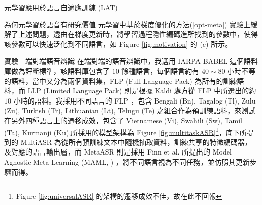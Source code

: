 \documentclass[12pt,UTF8,fntef]{article}
\begin{document}
\begin{section}{元學習應用於語言自適應訓練 (LAT)}
\begin{subsection}{為何元學習於語音有研究價值}
      元學習中基於梯度優化的方法(\ref{opt-meta}) 實驗上緩解了上述問題，透由在梯度更新時，將學習過程隱性編碼進所找到的參數中，使得該參數可以快速泛化到不同語言，如 Figure \ref{fig:motivation} 的 (c) 所示。
    \end{subsection}
    \begin{subsection}{實驗 - 端對端語音辨識} \label{progress}
      在端對端的語音辨識中，我選用 IARPA-BABEL 這個語料庫做為評斷標準，該語料庫包含了 $10$ 餘種語言，每個語言約有 $40 \sim 80$ 小時不等的語料，當中又分為兩個資料集，FLP (Full Language Pack) 為所有的訓練語料，而 LLP (Limited Language Pack) 則是根據 Kaldi 處方從 FLP 中所選出的約 $10$ 小時的語料。我採用不同語言的 FLP ，包含 Bengali (Bn), Tagalog (Tl), Zulu (Zu), Turkish (Tr), Lithuanian (Lt), Telugu (Te) 之組合作為預訓練語料，來測試在另外四種語言上的遷移成效，包含了 Vietnamese (Vi), Swahili (Sw), Tamil (Ta), Kurmanji (Ku),所採用的模型架構為 Figure \ref{fig:multitaskASR}\footnote{Figure \ref{fig:universalASR} 的架構的遷移成效不佳，故在此不回報}，底下所提到的 MultiASR 為從所有預訓練文本中隨機抽取資料，訓練共享的特徵編碼器，及對應的語言輸出層，而 MetaASR 則是採用 Finn et al. 所提出的 Model Agnostic Meta Learning (MAML, \cite{finn2017model}) ，將不同語言視為不同任務，並仿照其更新步驟而得。
    \end{subsection}


\end{section}
\end{document}
